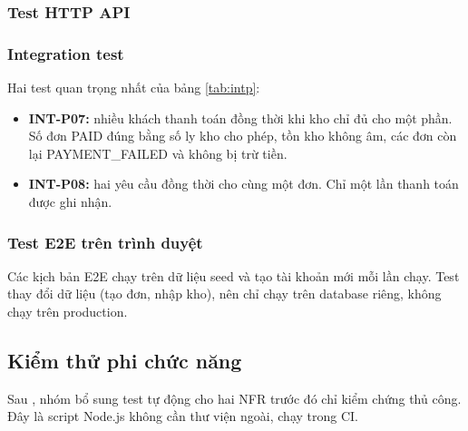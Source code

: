 

\subsubsection{Test HTTP API}



\subsubsection{Integration test}



Hai test quan trọng nhất của bảng \ref{tab:intp}:
\begin{itemize}
\item \textbf{INT-P07:} nhiều khách thanh toán đồng thời khi kho chỉ đủ cho một phần. Số đơn PAID đúng bằng số ly kho cho phép, tồn kho không âm, các đơn còn lại PAYMENT\_FAILED và không bị trừ tiền.
\item \textbf{INT-P08:} hai yêu cầu đồng thời cho cùng một đơn. Chỉ một lần thanh toán được ghi nhận.
\end{itemize}






\subsubsection{Test E2E trên trình duyệt}\label{sec:e2e}
Các kịch bản E2E chạy trên dữ liệu seed và tạo tài khoản mới mỗi lần chạy. Test thay đổi dữ liệu (tạo đơn, nhập kho), nên chỉ chạy trên database riêng, không chạy trên production.



\subsection{Kiểm thử phi chức năng}\label{sec:nfrtest}
Sau , nhóm bổ sung test tự động cho hai NFR trước đó chỉ kiểm chứng thủ công. Đây là script Node.js không cần thư viện ngoài, chạy trong CI.

